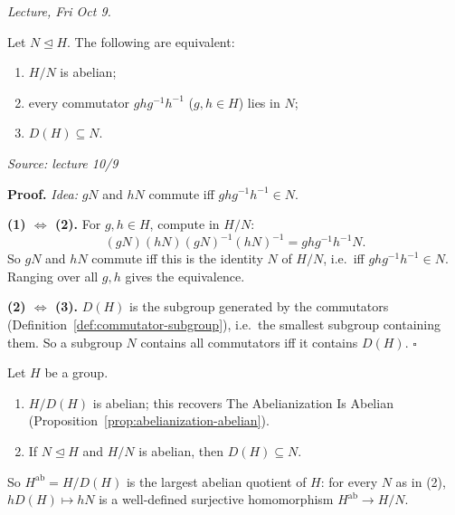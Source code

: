 \documentclass[11pt]{report}
\renewenvironment{proof}[1][Proof]{\noindent\textbf{#1.} }{\hfill$\square$\par\vspace{5pt}}
\newcommand{\srcline}[1]{\par\hfill{\footnotesize\textit{Source: #1}}}
\begin{document}
\textit{Lecture, Fri Oct 9.}

\begin{propbox}\label{prop:abelian-quotients-commutators}
Let $N \trianglelefteq H$. The following are equivalent:
\begin{enumerate}
    \item $H/N$ is abelian;
    \item every commutator $ghg^{-1}h^{-1}$ ($g, h \in H$) lies in $N$;
    \item $D(H) \subseteq N$.
\end{enumerate}
\srcline{lecture 10/9}
\end{propbox}

\begin{proof}
\textit{Idea:} $gN$ and $hN$ commute iff $ghg^{-1}h^{-1} \in N$.\par
\textbf{(1) $\Leftrightarrow$ (2).} For $g, h \in H$, compute in $H/N$:
\[ (gN)(hN)(gN)^{-1}(hN)^{-1} = ghg^{-1}h^{-1}N. \]
So $gN$ and $hN$ commute iff this is the identity $N$ of $H/N$, i.e.\ iff $ghg^{-1}h^{-1} \in N$. Ranging over all $g, h$ gives the equivalence.

\textbf{(2) $\Leftrightarrow$ (3).} $D(H)$ is the subgroup generated by the commutators (Definition~\ref{def:commutator-subgroup}), i.e.\ the smallest subgroup containing them. So a subgroup $N$ contains all commutators iff it contains $D(H)$.
\end{proof}

\begin{corbox}\label{cor:derived-subgroup-smallest-abelian-quotient}
Let $H$ be a group.
\begin{enumerate}
    \item $H/D(H)$ is abelian; this recovers The Abelianization Is Abelian (Proposition~\ref{prop:abelianization-abelian}).
    \item If $N \trianglelefteq H$ and $H/N$ is abelian, then $D(H) \subseteq N$.
\end{enumerate}
So $H^{\mathrm{ab}} = H/D(H)$ is the largest abelian quotient of $H$: for every $N$ as in (2), $hD(H) \mapsto hN$ is a well-defined surjective homomorphism $H^{\mathrm{ab}} \to H/N$.
\end{corbox}
\end{document}
